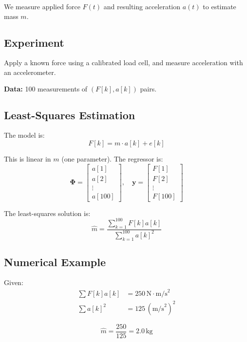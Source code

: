 We measure applied force $F(t)$ and resulting acceleration $a(t)$ to estimate mass $m$.

\subsection{Experiment}

Apply a known force using a calibrated load cell, and measure acceleration with an accelerometer.

\textbf{Data:} 100 measurements of $(F[k], a[k])$ pairs.

\subsection{Least-Squares Estimation}

The model is:
\begin{equation}
F[k] = m \cdot a[k] + e[k]
\end{equation}

This is linear in $m$ (one parameter). The regressor is:
\begin{equation}
\mathbf{\Phi} = \begin{bmatrix} a[1] \\ a[2] \\ \vdots \\ a[100] \end{bmatrix}, \quad
\mathbf{y} = \begin{bmatrix} F[1] \\ F[2] \\ \vdots \\ F[100] \end{bmatrix}
\end{equation}

The least-squares solution is:
\begin{equation}
\hat{m} = \frac{\sum_{k=1}^{100} F[k]a[k]}{\sum_{k=1}^{100} a[k]^2}
\end{equation}

\subsection{Numerical Example}

Given:
\begin{align}
\sum F[k]a[k] &= 250 \, \text{N}\cdot\text{m/s}^2 \\
\sum a[k]^2 &= 125 \, (\text{m/s}^2)^2
\end{align}

\begin{equation}
\hat{m} = \frac{250}{125} = 2.0 \, \text{kg}
\end{equation}

